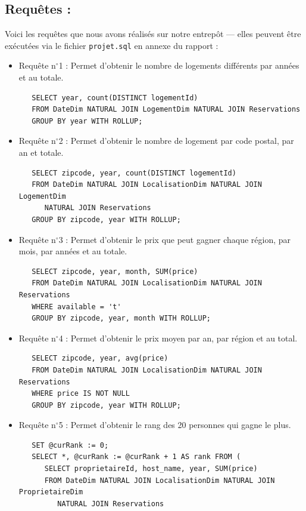 \documentclass[11pt, a4paper]{article}
\newcommand\tab{\hspace*{12.5mm}}
\begin{document}
\subsection{Requêtes :}
\tab Voici les requêtes que nous avons réalisés sur notre entrepôt --- elles peuvent être exécutées via le fichier \Verb|projet.sql| en annexe du rapport :
\begin{itemize}[label=\textbullet]
   \item Requête n$^\circ$1 :
   Permet d'obtenir le nombre de logements différents par années et au totale.
   \begin{lstlisting}
   SELECT year, count(DISTINCT logementId)
   FROM DateDim NATURAL JOIN LogementDim NATURAL JOIN Reservations
   GROUP BY year WITH ROLLUP;
   \end{lstlisting}
   \item Requête n$^\circ$2 :
   Permet d'obtenir le nombre de logement par code postal, par an et totale.
   \begin{lstlisting}
   SELECT zipcode, year, count(DISTINCT logementId)
   FROM DateDim NATURAL JOIN LocalisationDim NATURAL JOIN LogementDim
      NATURAL JOIN Reservations
   GROUP BY zipcode, year WITH ROLLUP;
   \end{lstlisting}
   \item Requête n$^\circ$3 :
   Permet d'obtenir le prix que peut gagner chaque région, par mois, par années et au totale.
   \begin{lstlisting}
   SELECT zipcode, year, month, SUM(price)
   FROM DateDim NATURAL JOIN LocalisationDim NATURAL JOIN Reservations
   WHERE available = 't'
   GROUP BY zipcode, year, month WITH ROLLUP;
   \end{lstlisting}
   \item Requête n$^\circ$4 :
   Permet d'obtenir le prix moyen par an, par région et au total.
   \begin{lstlisting}
   SELECT zipcode, year, avg(price)
   FROM DateDim NATURAL JOIN LocalisationDim NATURAL JOIN Reservations
   WHERE price IS NOT NULL
   GROUP BY zipcode, year WITH ROLLUP;
   \end{lstlisting}
   \item Requête n$^\circ$5 :
   Permet d'obtenir le rang des 20 personnes qui gagne le plus.
   \begin{lstlisting}
   SET @curRank := 0;
   SELECT *, @curRank := @curRank + 1 AS rank FROM (
      SELECT proprietaireId, host_name, year, SUM(price)
      FROM DateDim NATURAL JOIN LocalisationDim NATURAL JOIN ProprietaireDim
         NATURAL JOIN Reservations

\end{lstlisting}
\end{itemize}
\end{document}
